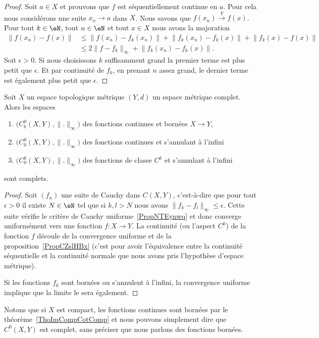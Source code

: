 \begin{proof}
	Soit \( a\in X\) et prouvons que \( f\) est séquentiellement continue en \( a\). Pour cela nous considérons une suite \( x_n\to a\) dans \( X\). Nous savons que \( f(x_n)\stackrel{Y}{\longrightarrow}f(x)\). Pour tout \(k\in \eN\), tout \( n\in \eN\) et tout \( x\in X\) nous avons la majoration
	\begin{subequations}
		\begin{align}
			\big\| f(x_n)-f(x) \big\| & \leq \big\| f(x_n)-f_k(x_n) \big\|+\big\| f_k(x_n)-f_k(x) \big\|+\big\| f_k(x)-f(x) \big\| \\
			                          & \leq 2\| f-f_k \|_{\infty}+\big\| f_k(x_n)-f_k(x) \big\|.
		\end{align}
	\end{subequations}
	Soit \( \epsilon>0\). Si nous choisissons \( k\) suffisamment grand la premier terme est plus petit que \( \epsilon\). Et par continuité de \( f_k\), en prenant \( n\) assez grand, le dernier terme est également plus petit que \( \epsilon\).
\end{proof}

\begin{proposition} \label{PropSYMEZGU}
	Soit \( X\) un espace topologique métrique \( (Y,d)\) un espace métrique complet. Alors les espaces
	\begin{enumerate}
		\item
		      \( \big( C^0_b(X,Y),\| . \|_{\infty} \big)\) des fonctions continues et bornées \( X\to Y\),
		\item
		      \( \big( C^0_0(X,Y),\| . \|_{\infty} \big)\) des fonctions continues et s'annulant à l'infini
		\item
		      \( \big( C^k_0(X,Y),\| . \|_{\infty} \big)\) des fonctions de classe \( C^k\) et s'annulant à l'infini
	\end{enumerate}
	sont complets.
\end{proposition}

\begin{proof}
	Soit \( (f_n)\) une suite de Cauchy dans \( C(X,Y)\), c'est-à-dire que pour tout \( \epsilon>0\) il existe \( N\in \eN\) tel que si \( k,l>N\) nous avons \( \| f_k-f_l \|_{\infty}\leq \epsilon\). Cette suite vérifie le critère de Cauchy uniforme~\ref{PropNTEynwq} et donc converge uniformément vers une fonction \( f\colon X\to Y\). La continuité (ou l'aspect \( C^k\)) de la fonction \( f\) découle de la convergence uniforme et de la proposition~\ref{PropCZslHBx} (c'est pour avoir l'équivalence entre la continuité séquentielle et la continuité normale que nous avons pris l'hypothèse d'espace métrique).

	Si les fonctions \( f_k\) sont bornées ou s'annulent à l'infini, la convergence uniforme implique que la limite le sera également.
\end{proof}
Notons que si \( X\) est compact, les fonctions continues sont bornées par le théorème~\ref{ThoImCompCotComp} et nous pouvons simplement dire que \( C^0(X,Y)\) est complet, sans préciser que nous parlons des fonctions bornées.


